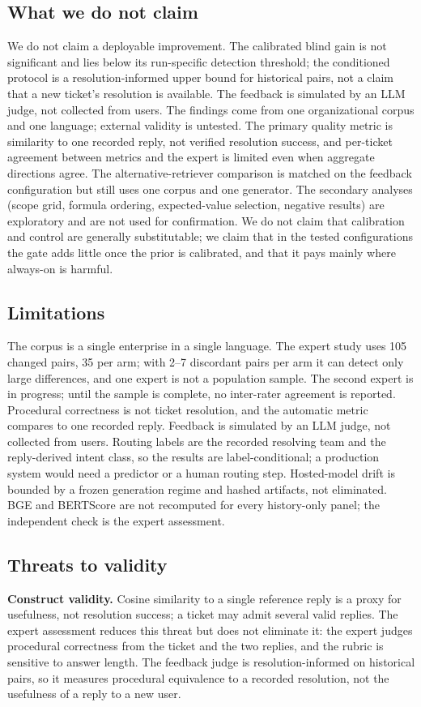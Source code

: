 \subsection{What we do not claim}
We do not claim a deployable improvement. The calibrated blind gain is not
significant and lies below its run-specific detection threshold; the conditioned
protocol is a resolution-informed upper bound for historical pairs, not a claim that
a new ticket's resolution is available. The feedback is simulated by an LLM judge,
not collected from users. The findings come from one organizational corpus and one
language; external validity is untested. The primary quality metric is similarity
to one recorded reply, not verified resolution success, and per-ticket agreement
between metrics and the expert is limited even when aggregate directions agree.
The alternative-retriever comparison is matched on the feedback configuration but
still uses one corpus and one generator. The secondary analyses (scope grid, formula
ordering, expected-value selection, negative results) are exploratory and are not
used for confirmation. We do not claim that calibration and control are generally
substitutable; we claim that in the tested configurations the gate adds little once
the prior is calibrated, and that it pays mainly where always-on is harmful.

\subsection{Limitations}
The corpus is a single enterprise in a single language. The expert study uses 105
changed pairs, 35 per arm; with 2--7 discordant pairs per arm it can detect only
large differences, and one expert is not a population sample. The second expert is
in progress; until the sample is complete, no inter-rater agreement is reported.
Procedural correctness is not ticket resolution, and the automatic metric compares
to one recorded reply. Feedback is simulated by an LLM judge, not collected from
users. Routing labels are the recorded resolving team and the reply-derived intent
class, so the results are label-conditional; a production system would need a
predictor or a human routing step. Hosted-model drift is bounded by a frozen
generation regime and hashed artifacts, not eliminated. BGE and BERTScore are not
recomputed for every history-only panel; the independent check is the expert
assessment.

\subsection{Threats to validity}
\textbf{Construct validity.} Cosine similarity to a single reference reply is a
proxy for usefulness, not resolution success; a ticket may admit several valid
replies. The expert assessment reduces this threat but does not eliminate it: the
expert judges procedural correctness from the ticket and the two replies, and the
rubric is sensitive to answer length. The feedback judge is resolution-informed on
historical pairs, so it measures procedural equivalence to a recorded resolution,
not the usefulness of a reply to a new user.

